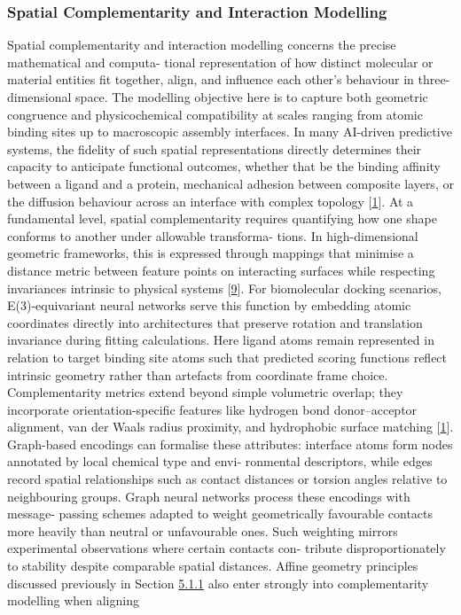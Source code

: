 \documentclass[
]{article}
\begin{document}
\hypertarget{spatial-complementarity-and-interaction-modelling}{%
\subsubsection{Spatial Complementarity and Interaction
Modelling}\label{spatial-complementarity-and-interaction-modelling}}

Spatial complementarity and interaction modelling concerns the precise
mathematical and computa- tional representation of how distinct
molecular or material entities fit together, align, and influence each
other's behaviour in three-dimensional space. The modelling objective
here is to capture both geometric congruence and physicochemical
compatibility at scales ranging from atomic binding sites up to
macroscopic assembly interfaces. In many AI-driven predictive systems,
the fidelity of such spatial representations directly determines their
capacity to anticipate functional outcomes, whether that be the binding
affinity between a ligand and a protein, mechanical adhesion between
composite layers, or the diffusion behaviour across an interface with
complex topology {[}\protect\hyperlink{_bookmark41}{1}{]}. At a
fundamental level, spatial complementarity requires quantifying how one
shape conforms to another under allowable transforma- tions. In
high-dimensional geometric frameworks, this is expressed through
mappings that minimise a distance metric between feature points on
interacting surfaces while respecting invariances intrinsic to physical
systems {[}\protect\hyperlink{_bookmark49}{9}{]}. For biomolecular
docking scenarios, E(3)-equivariant neural networks serve this function
by embedding atomic coordinates directly into architectures that
preserve rotation and translation invariance during fitting
calculations. Here ligand atoms remain represented in relation to target
binding site atoms such that predicted scoring functions reflect
intrinsic geometry rather than artefacts from coordinate frame choice.
Complementarity metrics extend beyond simple volumetric overlap; they
incorporate orientation-specific features like hydrogen bond
donor--acceptor alignment, van der Waals radius proximity, and
hydrophobic surface matching {[}\protect\hyperlink{_bookmark41}{1}{]}.
Graph-based encodings can formalise these attributes: interface atoms
form nodes annotated by local chemical type and envi- ronmental
descriptors, while edges record spatial relationships such as contact
distances or torsion angles relative to neighbouring groups. Graph
neural networks process these encodings with message- passing schemes
adapted to weight geometrically favourable contacts more heavily than
neutral or unfavourable ones. Such weighting mirrors experimental
observations where certain contacts con- tribute disproportionately to
stability despite comparable spatial distances. Affine geometry
principles discussed previously in Section
\protect\hyperlink{affine-projective-and-metric-geometry}{5.1.1} also
enter strongly into complementarity modelling when aligning
\end{document}
